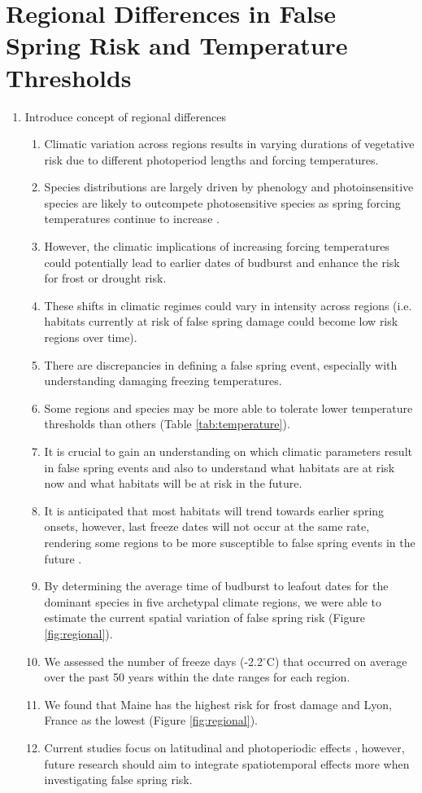 \documentclass{article}\usepackage[]{graphicx}\usepackage[]{color}
\begin{document}
\section*{Regional Differences in False Spring Risk and Temperature Thresholds}
\begin{enumerate}
\item Introduce concept of regional differences
\begin {enumerate}
\item Climatic variation across regions results in varying durations of vegetative risk due to different photoperiod lengths and forcing temperatures.
\item Species distributions are largely driven by phenology \citep{Chuine2001} and photoinsensitive species are likely to outcompete photosensitive species as spring forcing temperatures continue to increase \cite{Vitasse2011,Gauzere2017}.
\item However, the climatic implications of increasing forcing temperatures could potentially lead to earlier dates of budburst and enhance the risk for frost or drought risk. 
\item These shifts in climatic regimes could vary in intensity across regions (i.e. habitats currently at risk of false spring damage could become low risk regions over time). 
\item There are discrepancies in defining a false spring event, especially with understanding damaging freezing temperatures.
\item Some regions and species may be more able to tolerate lower temperature thresholds than others (Table \ref{tab:temperature}).
\item It is crucial to gain an understanding on which climatic parameters result in false spring events and also to understand what habitats are at risk now and what habitats will be at risk in the future. 
\item It is anticipated that most habitats will trend towards earlier spring onsets, however, last freeze dates will not occur at the same rate, rendering some regions to be more susceptible to false spring events in the future \citep{Labe2016}.
\item By determining the average time of budburst to leafout dates for the dominant species in five archetypal climate regions, we were able to estimate the current spatial variation of false spring risk (Figure \ref{fig:regional}).
\item We assessed the number of freeze days (-2.2$^{\circ}$C) \citep{Schwartz1993} that occurred on average over the past 50 years within the date ranges for each region.
\item We found that Maine has the highest risk for frost damage and Lyon, France as the lowest (Figure \ref{fig:regional}). 
\item Current studies focus on latitudinal and photoperiodic effects \citep{Partanen2004, Viheraaarnio2006, Caffarra2011, Gauzere2017}, however, future research should aim to integrate spatiotemporal effects more when investigating false spring risk.
\end {enumerate}
\end{enumerate}
\end{document}
